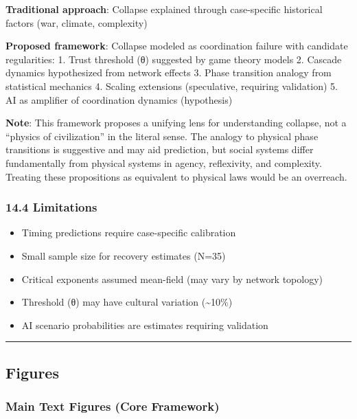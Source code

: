 \documentclass[11pt,letterpaper]{article}
\providecommand{\tightlist}{%
  \setlength{\itemsep}{0pt}\setlength{\parskip}{0pt}}
\begin{document}
\textbf{Traditional approach}: Collapse explained through case-specific
historical factors (war, climate, complexity)

\textbf{Proposed framework}: Collapse modeled as coordination failure
with candidate regularities: 1. Trust threshold (θ) suggested by game
theory models 2. Cascade dynamics hypothesized from network effects 3.
Phase transition analogy from statistical mechanics 4. Scaling
extensions (speculative, requiring validation) 5. AI as amplifier of
coordination dynamics (hypothesis)

\textbf{Note}: This framework proposes a unifying lens for understanding
collapse, not a ``physics of civilization'' in the literal sense. The
analogy to physical phase transitions is suggestive and may aid
prediction, but social systems differ fundamentally from physical
systems in agency, reflexivity, and complexity. Treating these
propositions as equivalent to physical laws would be an overreach.

\subsubsection{14.4 Limitations}\label{limitations}

\begin{itemize}
\tightlist
\item
  Timing predictions require case-specific calibration
\item
  Small sample size for recovery estimates (N=35)
\item
  Critical exponents assumed mean-field (may vary by network topology)
\item
  Threshold (θ) may have cultural variation (\textasciitilde10\%)
\item
  AI scenario probabilities are estimates requiring validation
\end{itemize}

\begin{center}\rule{0.5\linewidth}{0.5pt}\end{center}

\subsection{Figures}\label{figures}

\subsubsection{Main Text Figures (Core
Framework)}\label{main-text-figures-core-framework}
\end{document}
